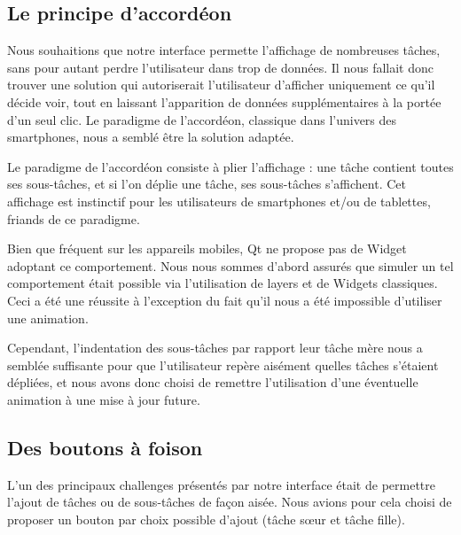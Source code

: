 \documentclass[11pt]{article}
\begin{document}
\subsection{Le principe d'accordéon}
\label{sec:accordeon}

Nous souhaitions que notre interface permette l'affichage de
nombreuses tâches, sans pour autant perdre l'utilisateur dans trop de
données. Il nous fallait donc trouver une solution qui autoriserait
l'utilisateur d'afficher uniquement ce qu'il décide voir, tout en
laissant l'apparition de données supplémentaires à la portée d'un seul
clic. Le paradigme de l'accordéon, classique dans l'univers des
smartphones, nous a semblé être la solution adaptée.

Le paradigme de l'accordéon consiste à plier l'affichage : une tâche
contient toutes ses sous-tâches, et si l'on déplie une tâche, ses
sous-tâches s'affichent. Cet affichage est instinctif pour les
utilisateurs de smartphones et/ou de tablettes, friands de ce
paradigme.

Bien que fréquent sur les appareils mobiles, Qt ne propose pas de
Widget adoptant ce comportement. Nous nous sommes d'abord assurés que
simuler un tel comportement était possible via l'utilisation de layers
et de Widgets classiques. Ceci a été une réussite à l'exception du
fait qu'il nous a été impossible d'utiliser une animation.

Cependant, l'indentation des sous-tâches par rapport leur tâche mère
nous a semblée suffisante pour que l'utilisateur repère aisément
quelles tâches s'étaient dépliées, et nous avons donc choisi de
remettre l'utilisation d'une éventuelle animation à une mise à jour
future.




\subsection{Des boutons à foison}
\label{subsec:boutonFoison}

L'un des principaux challenges présentés par notre interface était de
permettre l'ajout de tâches ou de sous-tâches de façon aisée. Nous
avions pour cela choisi de proposer un bouton par choix possible
d'ajout (tâche sœur et tâche fille).
\end{document}
